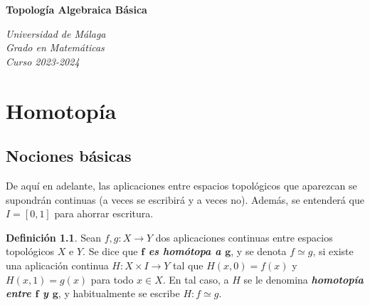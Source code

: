 \documentclass[11pt]{report}
\newenvironment{cdefinition} %
  {\begin{mdframed}[innertopmargin = 0pt,
                    innerbottommargin = 7.5pt,
                    backgroundcolor = lightgray!10,
                    linewidth = 1pt,
                    shadow = true,
                    shadowsize = 5pt,
                    roundcorner = 0pt,
                    skipabove = 0pt]
    \begin{definition}}
  {\end{definition}\end{mdframed}}
\theoremstyle{definition}
\newtheorem{definition}{Definición}[chapter]
\theoremstyle{definition}
\theoremstyle{remark}
\begin{document}
\setlength{\abovedisplayskip}{10pt}
\setlength{\belowdisplayskip}{10pt} %

\pagestyle{empty}

\begin{center}
    \vspace*{1cm} %
    \Huge \textbf{Topología Algebraica Básica}
        
    \vspace{10mm} %
    \large
        
\textit{Universidad de Málaga \\[5pt]
Grado en Matemáticas \\[5pt]
Curso 2023-2024}
\end{center}

\doublespacing
\tableofcontents
\singlespacing

\pagestyle{fancy}
\renewcommand{\chaptermark}[1]{\markboth{#1}{}}
\fancyhf{}
\fancyhead[R]{\textbf{\scriptsize \thepage}}


\chapter{Homotopía}

\section{Nociones básicas}
De aquí en adelante, las aplicaciones entre espacios topológicos que aparezcan se supondrán continuas (a veces se escribirá y a veces no). Además, se entenderá que $I = [0,1]$ para ahorrar escritura.

\hfill

\begin{cdefinition}
Sean $f,g \colon X \to Y$ dos aplicaciones continuas entre espacios topológicos $X$ e $Y$. Se dice que \textbf{\textit{$\bm{f}$ es homótopa a $\bm{g}$}}, y se denota $f \simeq g$, si existe una aplicación continua $H \colon X \times I \to Y$ tal que $H(x,0) = f(x)$ y $H(x,1) = g(x)$ para todo $x \in X$. En tal caso, a $H$ se le denomina \textbf{\textit{homotopía entre $\bm{f}$ y $\bm{g}$}}, y habitualmente se escribe $H \colon f \simeq g$.
\end{cdefinition}
\end{document}
